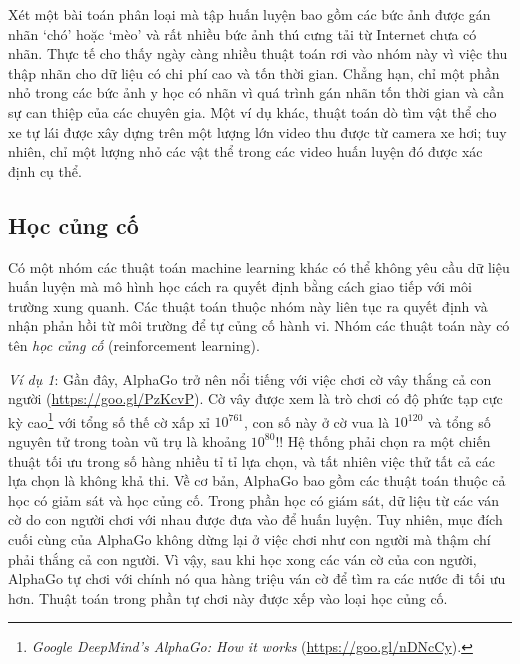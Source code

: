 Xét một bài toán phân loại mà tập huấn luyện bao gồm các bức ảnh được gán nhãn `chó' hoặc `mèo' và rất nhiều bức ảnh thú cưng tải từ Internet chưa có nhãn.
Thực tế cho thấy ngày càng nhiều thuật toán rơi vào nhóm này vì việc thu thập nhãn cho dữ liệu có chi phí cao và tốn thời gian. Chẳng hạn, chỉ một phần nhỏ trong các bức ảnh y học có nhãn vì quá trình gán nhãn tốn thời gian và cần sự can thiệp của các chuyên gia. Một ví dụ khác, thuật toán dò tìm vật thể cho xe tự lái được xây dựng trên một lượng lớn video thu được từ camera xe hơi; tuy nhiên, chỉ một lượng nhỏ các vật thể trong các video huấn luyện đó được xác định cụ thể.

\subsection{Học củng cố}


Có một nhóm các thuật toán machine learning khác có thể không yêu cầu dữ liệu
huấn luyện mà mô hình học cách ra quyết định bằng cách giao tiếp với môi trường
xung quanh. Các thuật toán thuộc nhóm này liên tục ra quyết định và nhận phản
hồi từ môi trường để tự củng cố hành vi. Nhóm các thuật toán này có tên
\textit{học củng cố} (reinforcement learning).




\textit{Ví dụ 1}: Gần đây, AlphaGo trở nên nổi tiếng với việc chơi cờ vây thắng
cả con người (\url{https://goo.gl/PzKcvP}). {Cờ vây được xem là trò chơi có độ
phức tạp cực kỳ cao}\footnote{\textit{Google DeepMind's AlphaGo: How it works}
(\url{https://goo.gl/nDNcCy}).} với tổng số thế cờ xấp xỉ $10^{761} $, con số
này ở cờ vua là $10^{120}$ và tổng số nguyên tử trong toàn vũ trụ là khoảng
$10^{80}$!! Hệ thống phải chọn ra một chiến thuật tối ưu trong số hàng nhiều tỉ
tỉ lựa chọn, và tất nhiên việc thử tất cả các lựa chọn là không khả thi. Về cơ
bản, AlphaGo bao gồm các thuật toán thuộc cả học có giảm sát và học củng cố.
Trong phần học có giám sát, dữ liệu từ các ván cờ do con người chơi với nhau
được đưa vào để huấn luyện. Tuy nhiên, mục đích cuối cùng của AlphaGo không dừng
lại ở việc chơi như con người mà thậm chí phải thắng cả con người. Vì vậy, sau
khi học xong các ván cờ của con người, AlphaGo tự chơi với chính nó qua hàng
triệu ván cờ để tìm ra các nước đi tối ưu hơn. Thuật toán trong phần tự chơi này
được xếp vào loại học củng cố.

